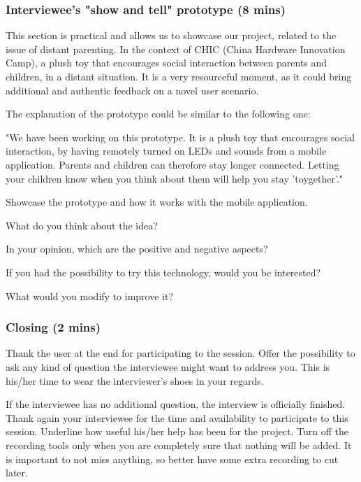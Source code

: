 \vspace{2pt}
\subsubsection{Interviewee's "show and tell" prototype (8 mins)}

This section is practical and allows us to showcase our project, related to the issue of distant parenting. In the context of CHIC (China Hardware Innovation Camp), a plush toy that encourages social interaction between parents and children, in a distant situation. It is a very resourceful moment, as it could bring additional and authentic feedback on a novel user scenario.

The explanation of the prototype could be similar to the following one:

"We have been working on this prototype. It is a plush toy that encourages social interaction, by having remotely turned on LEDs and sounds from a mobile application. Parents and children can therefore stay longer connected. Letting your children know when you think about them will help you stay 'toygether'\texttrademark."

Showcase the prototype and how it works with the mobile application.

\begin{todolist}
    \item What do you think about the idea?
    \item In your opinion, which are the positive and negative aspects?
    \item If you had the possibility to try this technology, would you be interested?
    \item What would you modify to improve it?
\end{todolist}

\vspace{2pt}
\subsubsection{Closing (2 mins)}

Thank the user at the end for participating to the session. Offer the possibility to ask any kind of question the interviewee might want to address you.  This is his/her time to wear the interviewer's shoes in your regards.

If the interviewee has no additional question, the interview is officially finished. Thank again your interviewee for the time and availability to participate to this session. Underline how useful his/her help has been for the project.
Turn off the recording tools only when you are completely sure that nothing will be added. It is important to not miss anything, so better have some extra recording to cut later.

